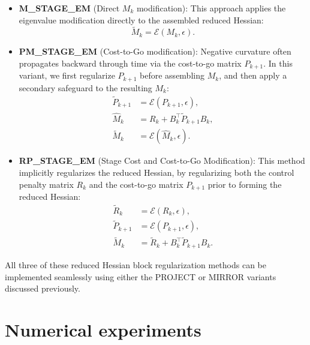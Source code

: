 \documentclass[conference]{IEEEtran}
\begin{document}
\begin{itemize}
    \item \textbf{M\_STAGE\_EM} (Direct $M_k$ modification): 
    This approach applies the eigenvalue modification directly to the assembled reduced Hessian:
    \begin{equation*}
        \tilde{M}_k = \mathcal{E}(M_k, \epsilon).
    \end{equation*}

    \item \textbf{PM\_STAGE\_EM} (Cost-to-Go modification): 
    Negative curvature often propagates backward through time via the cost-to-go matrix $P_{k+1}$. 
    In this variant, we first regularize $P_{k+1}$ before assembling $M_k$, and then apply a secondary safeguard to the resulting $M_k$:
    \begin{equation*}
        \begin{aligned}
            \tilde{P}_{k+1} &= \mathcal{E}(P_{k+1}, \epsilon), \\
            \hat{M}_k &= R_k + B_k^\top \tilde{P}_{k+1} B_k, \\
            \tilde{M}_k &= \mathcal{E}(\hat{M}_k, \epsilon).
        \end{aligned}
    \end{equation*}

    \item \textbf{RP\_STAGE\_EM} (Stage Cost and Cost-to-Go Modification): 
    This method implicitly regularizes the reduced Hessian, by regularizing both the control penalty matrix $R_k$ and the cost-to-go matrix $P_{k+1}$ prior to forming the reduced Hessian:
    \begin{equation*}
        \begin{aligned}
            \tilde{R}_k &= \mathcal{E}(R_k, \epsilon), \\
            \tilde{P}_{k+1} &= \mathcal{E}(P_{k+1}, \epsilon), \\
            \tilde{M}_k &= \tilde{R}_k + B_k^\top \tilde{P}_{k+1} B_k.
        \end{aligned}
    \end{equation*}
\end{itemize}

All three of these reduced Hessian block regularization methods can be implemented seamlessly using either the PROJECT or MIRROR variants discussed previously.

\section{Numerical experiments}
\end{document}
